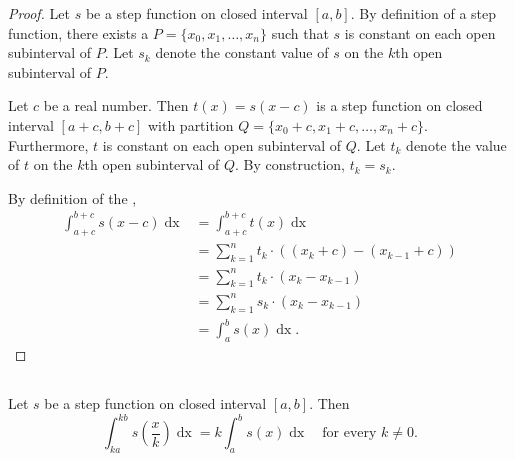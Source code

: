 \documentclass{report}
\begin{document}
  \begin{proof}
    Let $s$ be a step function on closed interval $[a, b]$.
    By definition of a step function, there exists a 
      $P = \{x_0, x_1, \ldots, x_n\}$ such that $s$ is constant on each open
      subinterval of $P$.
    Let $s_k$ denote the constant value of $s$ on the $k$th open subinterval of
      $P$.

    Let $c$ be a real number.
    Then $t(x) = s(x - c)$ is a step function on closed interval
      $[a + c, b + c]$ with partition
      $Q = \{x_0 + c, x_1 + c, \ldots, x_n + c\}$.
    Furthermore, $t$ is constant on each open subinterval of $Q$.
    Let $t_k$ denote the value of $t$ on the $k$th open subinterval of $Q$.
    By construction, $t_k = s_k$.

    By definition of the ,
      \begin{align*}
        \int_{a+c}^{b+c} s(x - c) \mathop{dx}
          & = \int_{a+c}^{b+c} t(x) \mathop{dx} \\
          & = \sum_{k=1}^n t_k \cdot ((x_k + c) - (x_{k - 1} + c)) \\
          & = \sum_{k=1}^n t_k \cdot (x_k - x_{k - 1}) \\
          & = \sum_{k=1}^n s_k \cdot (x_k - x_{k - 1}) \\
          & = \int_a^b s(x) \mathop{dx}.
      \end{align*}
  \end{proof}

\subsection{}%

  \begin{theorem}[1.8]
    Let $s$ be a step function on closed interval $[a, b]$.
    Then
      $$\int_{ka}^{kb} s \left( \frac{x}{k} \right) \mathop{dx} =
        k \int_a^b s(x) \mathop{dx} \quad\text{for every } k \neq 0.$$
  \end{theorem}
\end{document}
